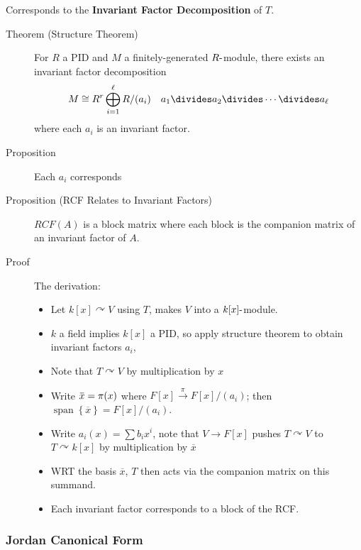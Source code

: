 Corresponds to the \textbf{Invariant Factor Decomposition} of \(T\).

\begin{description}
\item[Theorem (Structure Theorem)]
For \(R\) a PID and \(M\) a finitely-generated \(R{\hbox{-}}\)module,
there exists an invariant factor decomposition
\begin{align*} M \cong R^r \bigoplus_{i=1}^\ell R/(a_i) \quad a_1 \divides a_2 \divides \cdots \divides a_\ell \end{align*}
where each \(a_i\) is an invariant factor.
\item[Proposition]
Each \(a_i\) corresponds
\item[Proposition (RCF Relates to Invariant Factors)]
\(RCF(A)\) is a block matrix where each block is the companion matrix of
an invariant factor of \(A\).
\item[Proof]
The derivation:

\begin{itemize}
\item
  Let \(k[x] \curvearrowright V\) using \(T\), makes \(V\) into a
  \(k[x]{\hbox{-}}\)module.
\item
  \(k\) a field implies \(k[x]\) a PID, so apply structure theorem to
  obtain invariant factors \(a_i\),
\item
  Note that \(T\curvearrowright V\) by multiplication by \(x\)
\item
  Write
  \(\mkern 1.5mu\overline{\mkern-1.5mux\mkern-1.5mu}\mkern 1.5mu = \pi(x)\)
  where \(F[x] \xrightarrow{\pi} F[x]/(a_i)\); then
  \({\operatorname{span}}\left\{{\overline x}\right\} = F[x]/(a_i)\).
\item
  Write \(a_i(x) = \sum b_i x^i\), note that \(V \to F[x]\) pushes
  \(T\curvearrowright V\) to \(T\curvearrowright k[x]\) by
  multiplication by \(\overline x\)
\item
  WRT the basis \(\overline x\), \(T\) then acts via the companion
  matrix on this summand.
\item
  Each invariant factor corresponds to a block of the RCF.
\end{itemize}
\end{description}

\hypertarget{jordan-canonical-form}{%
\subsubsection{Jordan Canonical Form}\label{jordan-canonical-form}}

